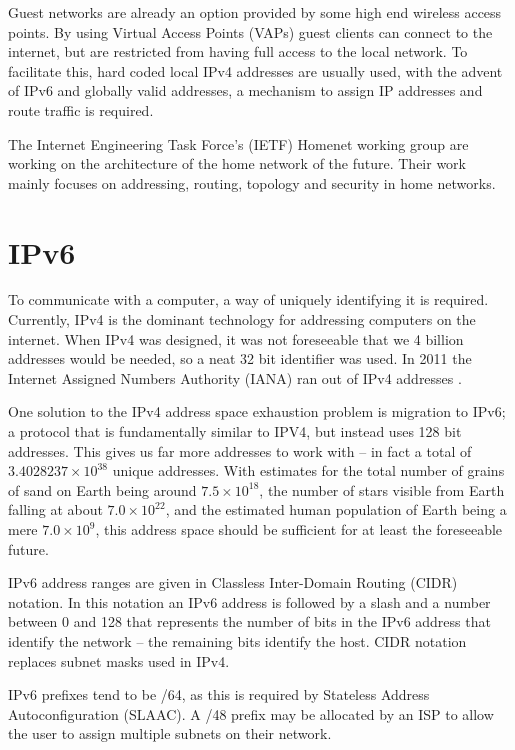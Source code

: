 \documentclass[12pt,a4paper,twoside]{report}
\begin{document}
Guest networks are already an option provided by some high end wireless access
points. By using Virtual Access Points (VAPs)  guest clients can connect to the internet, but are restricted from
having full access to the local network. To facilitate this, hard coded local
IPv4 addresses are usually used, with the advent of IPv6 and globally valid
addresses, a mechanism to assign IP addresses and route traffic is required. 

The Internet Engineering Task Force's (IETF) Homenet working group
\cite{homenet} are working on the architecture of the home network of the
future. Their work mainly focuses on addressing, routing, topology and security
in home networks. 

\section{IPv6}
To communicate with a computer, a way of uniquely identifying it is required.
Currently, IPv4 is the dominant technology for addressing computers on the
internet. When IPv4 was designed, it was not foreseeable that we 4 billion
addresses would be needed, so a neat 32 bit identifier was used.  In 2011 the
Internet Assigned Numbers Authority (IANA)  ran out of IPv4 addresses \cite{potaroo}. 

One solution to the IPv4 address space exhaustion problem is migration to
IPv6; a protocol that is fundamentally similar to IPV4, but instead uses 128
bit addresses. This gives us far more addresses to work with -- in fact a total
of $3.4028237\times10^{38}$ unique addresses. With estimates for the total
number of grains of sand on Earth being around $7.5\times10^{18}$, the number
of stars visible from Earth falling at about $7.0\times10^{22}$, and the
estimated human population of Earth being a mere $7.0\times10^{9}$,
this address space should be sufficient for at least the foreseeable future. 

IPv6 address ranges are given in Classless Inter-Domain Routing (CIDR)
 notation. In this notation
an IPv6 address is followed by a slash and a number between 0 and 128 that
represents the number of bits in the IPv6 address that identify the network --
the remaining bits identify the host. CIDR notation replaces subnet masks used
in IPv4.

IPv6 prefixes tend to be /64, as this is required by Stateless Address
Autoconfiguration (SLAAC). A /48 prefix may be allocated by an ISP to allow the user
to assign multiple subnets on their network.
\end{document}
